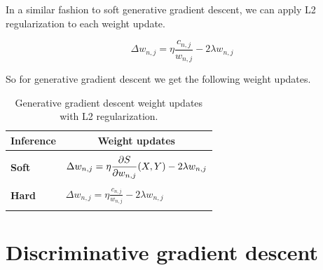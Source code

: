In a similar fashion to soft generative gradient descent, we can apply L2 regularization to each
weight update.

\begin{equation}
  \Delta w_{n,j}=\eta\frac{c_{n,j}}{w_{n,j}}-2\lambda w_{n,j}
\end{equation}

So for generative gradient descent we get the following weight updates.

\begin{table}[h]
  \centering
  \begin{tabular}{l|l}
    \hline
    \multicolumn{1}{c}{\bfseries Inference} & \multicolumn{1}{c}{\bfseries Weight updates}\\
    \hline & \\
    \textbf{Soft} & \(\displaystyle \Delta w_{n,j}=\eta\frac{\partial S}{\partial w_{n,j}}(X, Y)-2\lambda w_{n,j} \) \\
    & \\
    \textbf{Hard} & \(\displaystyle \Delta w_{n,j}=\eta\frac{c_{n,j}}{w_{n,j}}-2\lambda w_{n,j} \) \\
    & \\
    \hline
  \end{tabular}
  \caption{Generative gradient descent weight updates with L2
    regularization.\label{tab:generative_weight_updates}}
\end{table}



\section{Discriminative gradient descent}


